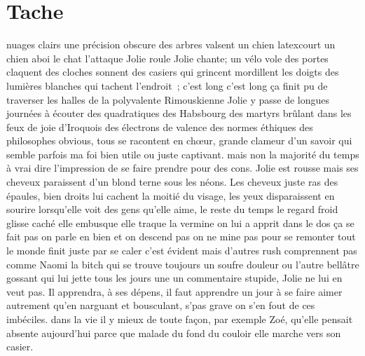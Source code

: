  \section*{Tache}
 nuages clairs une précision obscure des arbres valsent un chien latexcourt un
 chien aboi le chat l’attaque Jolie roule Jolie chante; un vélo vole des portes
 claquent des cloches sonnent des casiers qui grincent mordillent les doigts
 des lumières blanches qui tachent l’endroit ; c’est long c’est long ça finit
 pu de traverser les halles de la polyvalente Rimouskienne Jolie y passe de
 longues journées à écouter des quadratiques des Habsbourg des martyrs brûlant
 dans les feux de joie d’Iroquois des électrons de valence des normes éthiques
 des philosophes obvious, tous se racontent en chœur, grande clameur d’un
 savoir qui semble parfois ma foi bien utile ou juste captivant. mais non la
 majorité du temps à vrai dire l’impression de se faire prendre pour des cons.
 Jolie est rousse mais ses cheveux paraissent d’un blond terne sous les néons.
 Les cheveux juste ras des épaules, bien droits lui cachent la moitié du
 visage, les yeux disparaissent en sourire lorsqu’elle voit des gens qu’elle
 aime, le reste du temps le regard froid glisse caché elle embusque elle traque
 la vermine on lui a apprit dans le dos ça se fait pas on parle en bien et on
 descend pas on ne mine pas pour se remonter tout le monde finit juste par se
 caler c’est évident mais d’autres rush comprennent pas comme Naomi la bitch
 qui se trouve toujours un soufre douleur ou l’autre bellâtre gossant qui lui
 jette tous les jours une un commentaire stupide, Jolie ne lui en veut pas. Il
 apprendra, à ses dépens, il faut apprendre un jour à se faire aimer autrement
 qu’en narguant et bousculant, s’pas grave on s’en fout de ces imbéciles. dans
 la vie il y mieux de toute façon, par exemple Zoé, qu’elle pensait absente
 aujourd’hui parce que malade du fond du couloir elle marche vers son casier.

